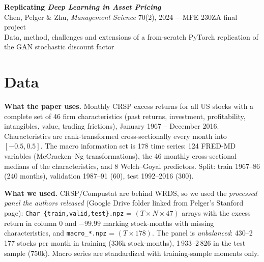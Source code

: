 \documentclass[10pt]{article}
\begin{document}
\begin{center}
{\LARGE\bfseries Replicating \emph{Deep Learning in Asset Pricing}}\\[2pt]
{\normalsize Chen, Pelger \& Zhu, \emph{Management Science} 70(2), 2024 \quad---\quad MFE 230ZA final project}\\[1pt]
{\small Data, method, challenges and extensions of a from-scratch PyTorch replication of the GAN stochastic discount factor}
\end{center}
\vspace{-4pt}

\section{Data}
\textbf{What the paper uses.} Monthly CRSP excess returns for all US stocks with a complete set of 46 firm characteristics
(past returns, investment, profitability, intangibles, value, trading frictions), January 1967 -- December 2016.
Characteristics are rank-transformed cross-sectionally every month into $[-0.5,0.5]$. The macro information set is 178
time series: 124 FRED-MD variables (McCracken--Ng transformations), the 46 monthly cross-sectional medians of the
characteristics, and 8 Welch--Goyal predictors. Split: train 1967--86 (240 months), validation 1987--91 (60), test
1992--2016 (300).

\textbf{What we used.} CRSP/Compustat are behind WRDS, so we used the \emph{processed panel the authors released}
(Google Drive folder linked from Pelger's Stanford page): \texttt{Char\_\{train,valid,test\}.npz} = $(T\times N\times 47)$
arrays with the excess return in column 0 and $-99.99$ marking stock-months with missing characteristics, and
\texttt{macro\_*.npz} = $(T\times 178)$. The panel is \emph{unbalanced}: 430--2\,177 stocks per month in training
(336k stock-months), 1\,933--2\,826 in the test sample (750k). Macro series are standardized with training-sample
moments only.
\end{document}
